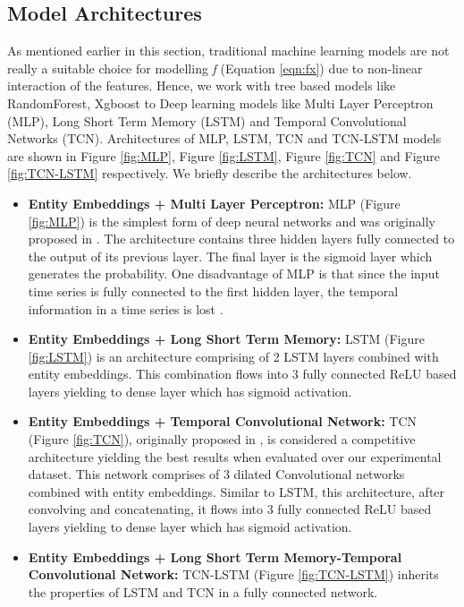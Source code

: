 \subsection{Model Architectures}
As mentioned earlier in this section, traditional machine learning models are not really a suitable choice for modelling \emph{f} 
(Equation \ref{eqn:fx}) due to non-linear interaction of the features. Hence, we work with
tree based models like RandomForest, Xgboost \cite{chen2016xgboost} 
to Deep learning models like Multi Layer Perceptron (MLP), Long Short 
Term Memory (LSTM) and Temporal Convolutional Networks (TCN). Architectures of MLP, LSTM, TCN \cite{lea2016temporal} 
and TCN-LSTM \cite{karim2017lstm} models are shown in Figure \ref{fig:MLP}, Figure \ref{fig:LSTM}, Figure \ref{fig:TCN}
and Figure \ref{fig:TCN-LSTM} respectively. We briefly describe the architectures below.
\begin{itemize}
\item {\bf Entity Embeddings + Multi Layer Perceptron:} MLP (Figure \ref{fig:MLP}) is the simplest form of deep neural networks 
and was originally proposed in \cite{wang2017time}. The architecture contains 
three hidden layers fully connected to the output of its previous layer. The final layer 
is the sigmoid layer which generates the probability. One disadvantage of MLP is that since the input time 
series is fully connected to the first hidden layer, the temporal information in a time series is lost \cite{fawaz2019deep1}.
\item {\bf Entity Embeddings + Long Short Term Memory:} LSTM (Figure \ref{fig:LSTM}) is an
architecture comprising of 2 LSTM layers combined with entity embeddings. This combination flows into 
3 fully connected ReLU based layers yielding to dense layer which has sigmoid activation.
\item {\bf Entity Embeddings + Temporal Convolutional Network:} TCN (Figure \ref{fig:TCN}), originally
proposed in \cite{lea2016temporal} , is considered a competitive architecture yielding the best results when evaluated over 
our experimental dataset. This network comprises of 3 dilated Convolutional networks combined with entity embeddings.
Similar to LSTM, this architecture, after convolving and concatenating, it flows into 
3 fully connected ReLU based layers yielding to dense layer which has sigmoid activation.
\item {\bf Entity Embeddings + Long Short Term Memory-Temporal Convolutional Network:} TCN-LSTM (Figure \ref{fig:TCN-LSTM})
inherits the properties of LSTM and TCN in a fully connected network.
\end{itemize}
